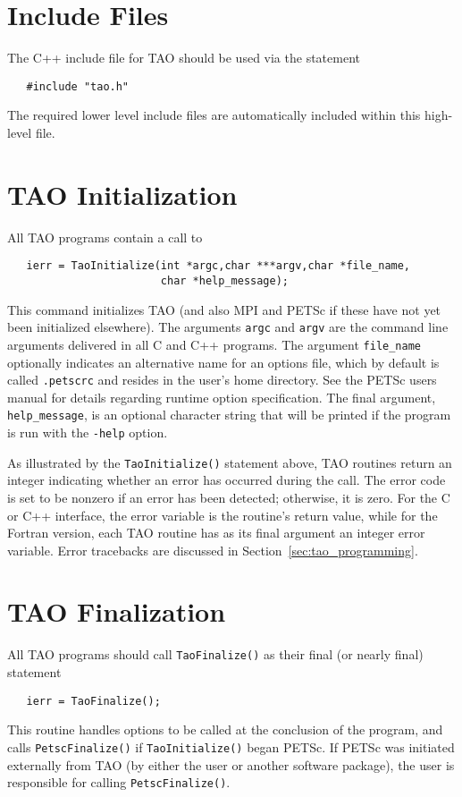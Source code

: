 \section{Include Files}

The C++ include file for TAO should be used via the statement
\begin{verbatim}
   #include "tao.h"
\end{verbatim}
\noindent
The required lower level include files are automatically included
within this high-level file.

\section{TAO Initialization}
\label{sec:initialization}

All TAO programs contain a call to 
\begin{verbatim}
   ierr = TaoInitialize(int *argc,char ***argv,char *file_name, 
                        char *help_message);
\end{verbatim}
\noindent 
This command initializes TAO (and also MPI and PETSc if these have not
yet been initialized elsewhere).  The arguments \texttt{argc} and
\texttt{argv} are the command line arguments delivered in all C and
C++ programs.  The argument
\texttt{file\_name} optionally indicates an alternative name for an
options file, which by default is called \texttt{.petscrc} and resides
in the user's home directory.  See the PETSc users manual for details
regarding runtime option specification.  The final argument,
\texttt{help\_message}, is an optional character string that will be
printed if the program is run with the \texttt{-help} option.

As illustrated by the \texttt{TaoInitialize()} statement above, TAO
routines return an integer indicating whether an error has occurred
during the call.  The error code is set to be nonzero if an error has
been detected; otherwise, it is zero.  For the C or C++ interface, the
error variable is the routine's return value, while for the Fortran
version, each TAO routine has as its final argument an integer error
variable.  Error tracebacks are discussed in
Section~\ref{sec:tao_programming}.

\section{TAO Finalization}

All TAO programs should call \texttt{TaoFinalize()}
 as their final (or nearly final) statement
\begin{verbatim}
   ierr = TaoFinalize();
\end{verbatim}
\noindent
This routine handles options to be called at the conclusion of the
program, and calls \texttt{PetscFinalize()} %
if \texttt{TaoInitialize()} began PETSc. If PETSc was initiated
externally from TAO (by either the user or another software package),
the user is responsible for calling \texttt{PetscFinalize()}.

